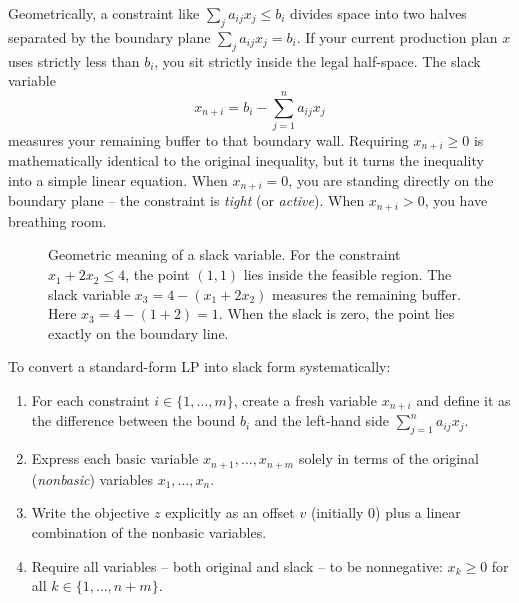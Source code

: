 \begin{intuitionbox}
Geometrically, a constraint like $\sum_j a_{ij} x_j \le b_i$ divides space into
two halves separated by the boundary plane $\sum_j a_{ij} x_j = b_i$. If your
current production plan $x$ uses strictly less than $b_i$, you sit strictly
inside the legal half-space. The slack variable
\[
x_{n+i} = b_i - \sum_{j=1}^n a_{ij} x_j
\]
measures your remaining buffer to that boundary wall.
Requiring $x_{n+i} \ge 0$ is mathematically identical to the original
inequality, but it turns the
inequality into a simple linear equation. When $x_{n+i} = 0$, you are standing
directly on the boundary plane -- the constraint is \emph{tight} (or
\emph{active}). When $x_{n+i} > 0$, you have breathing room.
\end{intuitionbox}

\begin{figure}[H]
\centering
{}
\caption{Geometric meaning of a slack variable. For the constraint $x_1 + 2x_2 \le 4$, the point $(1,1)$ lies inside the feasible region. The slack variable $x_3 = 4 - (x_1 + 2x_2)$ measures the remaining buffer. Here $x_3 = 4 - (1 + 2) = 1$. When the slack is zero, the point lies exactly on the boundary line.}
\label{ch28:fig-slack}
\end{figure}

To convert a standard-form LP into slack form systematically:
\begin{enumerate}
\item For each constraint $i \in \{1,\dots,m\}$, create a fresh variable
  $x_{n+i}$ and define it as the difference between the bound $b_i$ and the
  left-hand side $\sum_{j=1}^n a_{ij} x_j$.
\item Express each basic variable $x_{n+1},\dots,x_{n+m}$ solely in terms
  of the original (\emph{nonbasic}) variables $x_1,\dots,x_n$.
\item Write the objective $z$ explicitly as an offset $v$ (initially $0$) plus a
  linear combination of the nonbasic variables.
\item Require all variables -- both original and slack -- to be nonnegative:
  $x_k \ge 0$ for all $k \in \{1,\dots,n+m\}$.
\end{enumerate}

